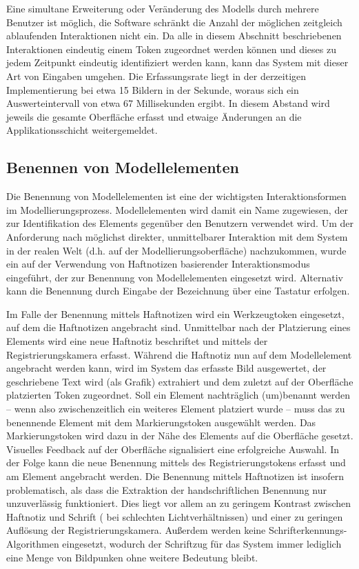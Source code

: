 Eine simultane Erweiterung oder Veränderung des Modells durch mehrere Benutzer ist möglich, die Software schränkt die Anzahl der möglichen zeitgleich ablaufenden Interaktionen nicht ein. Da alle in diesem Abschnitt beschriebenen Interaktionen eindeutig einem Token zugeordnet werden können und dieses zu jedem Zeitpunkt eindeutig identifiziert werden kann, kann das System mit dieser Art von Eingaben umgehen. Die Erfassungsrate liegt in der derzeitigen Implementierung bei etwa 15 Bildern in der Sekunde, woraus sich ein Auswerteintervall von etwa 67 Millisekunden ergibt. In diesem Abstand wird jeweils die gesamte Oberfläche erfasst und etwaige Änderungen an die Applikationsschicht weitergemeldet.
 

\subsection{Benennen von Modellelementen} %
\label{sub:benennen_von_modellelementen}

Die Benennung von Modellelementen ist eine der wichtigsten Interaktionsformen im Modellierungsprozess. Modellelementen wird damit ein Name zugewiesen, der zur Identifikation des Elements gegenüber den Benutzern verwendet wird. Um der Anforderung nach möglichst direkter, unmittelbarer Interaktion mit dem System in der realen Welt (d.h. auf der Modellierungsoberfläche) nachzukommen, wurde ein auf der Verwendung von Haftnotizen basierender Interaktionsmodus eingeführt, der zur Benennung von Modellelementen eingesetzt wird. Alternativ kann die Benennung durch Eingabe der Bezeichnung über eine Tastatur erfolgen.

Im Falle der Benennung mittels Haftnotizen wird ein Werkzeugtoken eingesetzt, auf dem die Haftnotizen angebracht sind. Unmittelbar nach der Platzierung eines Elements wird eine neue Haftnotiz beschriftet und mittels der Registrierungskamera erfasst. Während die Haftnotiz nun auf dem Modellelement angebracht werden kann, wird im System das erfasste Bild ausgewertet, der geschriebene Text wird (als Grafik) extrahiert und dem zuletzt auf der Oberfläche platzierten Token zugeordnet. Soll ein Element nachträglich (um)benannt werden -- wenn also zwischenzeitlich ein weiteres Element platziert wurde -- muss das zu benennende Element mit dem Markierungstoken ausgewählt werden. Das Markierungstoken wird dazu in der Nähe des Elements auf die Oberfläche gesetzt. Visuelles Feedback auf der Oberfläche signalisiert eine erfolgreiche Auswahl. In der Folge kann die neue Benennung mittels des Registrierungstokens erfasst und am Element angebracht werden. Die Benennung mittels Haftnotizen ist insofern problematisch, als dass die Extraktion der handschriftlichen Benennung nur unzuverlässig funktioniert. Dies liegt vor allem an zu geringem Kontrast zwischen Haftnotiz und Schrift ( bei schlechten Lichtverhältnissen) und einer zu geringen Auflösung der Registrierungskamera. Außerdem werden keine Schrifterkennungs-Algorithmen eingesetzt, wodurch der Schriftzug für das System immer lediglich eine Menge von Bildpunken ohne weitere Bedeutung bleibt.

